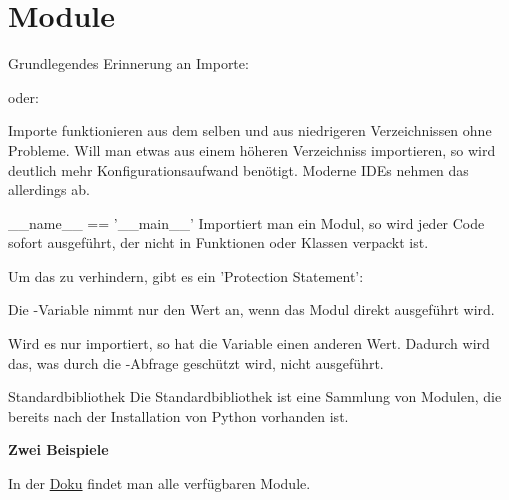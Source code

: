 \section{Module}
\begin{frame}{Grundlegendes}
	Erinnerung an Importe:
	
	oder:
	
	Importe funktionieren aus dem selben und aus niedrigeren Verzeichnissen ohne Probleme. Will man etwas aus einem höheren Verzeichniss importieren, so wird deutlich mehr Konfigurationsaufwand benötigt. Moderne IDEs nehmen das allerdings ab.	
\end{frame}

\begin{frame}{\_\_name\_\_ == '\_\_main\_\_'}
	Importiert man ein Modul, so wird jeder Code sofort ausgeführt, der nicht in Funktionen oder Klassen verpackt ist.
	
	Um das zu verhindern, gibt es ein 'Protection Statement':
	
	Die -Variable nimmt nur den Wert  an, wenn das Modul direkt ausgeführt wird. 
	
	Wird es nur importiert, so hat die Variable einen anderen Wert. Dadurch wird das, was durch die -Abfrage geschützt wird, nicht ausgeführt.
\end{frame}

\begin{frame}{Standardbibliothek}
	Die Standardbibliothek ist eine Sammlung von Modulen, die bereits nach der Installation von Python vorhanden ist.
	
	\textbf{Zwei Beispiele}
	
	
	
	In der \alert{\href{https://docs.python.org/3/library/}{Doku}} findet man alle verfügbaren Module.
\end{frame}

